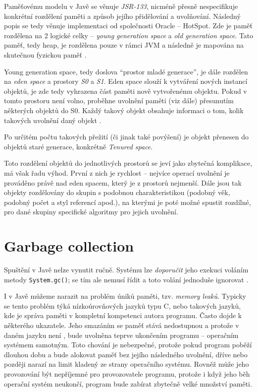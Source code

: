 Paměťovému modelu v Javě se věnuje \textit{JSR-133}, nicméně přesně nespecifikuje konkrétní rozdělení paměti a způsob jejího přidělování a uvolňování. Následný popis se tedy věnuje implementaci od společnosti Oracle – HotSpot. Zde je paměť rozdělena na 2 logické celky – \textit{young generation space} a \textit{old generation space}. Tato paměť, tedy heap, je rozdělena pouze v rámci JVM a následně je mapována na skutečnou fyzickou paměť \cite{jsr133}.

Young generation space, tedy doslova “prostor mladé generace”, je dále rozdělen na \textit{eden space} a prostory \textit{S0} a \textit{S1}. Eden space slouží k vytváření nových instancí objektů, je zde tedy vyhrazena část paměti nově vytvořenému objektu. Pokud v tomto prostoru není volno, proběhne uvolnění paměti (viz dále) přesunutím některých objektů do S0. Každý takový objekt obsahuje informaci o tom, kolik takových uvolnění daný objekt .

Po určitém počtu takových přežití (či jinak také povýšení) je objekt přenesen do objektů staré generace, konkrétně \textit{Tenured space}.

Toto rozdělení objektů do jednotlivých prostorů se jeví jako zbytečná komplikace, má však řadu výhod. První z nich je rychlost – nejvíce operací uvolnění je prováděno právě nad eden spacem, který je z prostorů nejmenší. Dále jsou tak objekty rozdělovány do skupin s podobnou charakteristikou (podobný věk, podobný počet a styl referencí apod.), na kterými je poté možné spustit rozdílné, pro dané skupiny specifické algoritmy pro jejich uvolnění.

\section{Garbage collection}
	Spuštění  v Javě nelze vynutit ručně. Systému lze \textit{doporučit} jeho exekuci voláním metody \texttt{System.gc()};  se tím ale nemusí řídit a toto volání jednoduše ignorovat \cite{javagc}. 

I v Javě můžeme narazit na problém úniků paměti, tzv. \textit{memory leaků}. Typicky se tento problém týká nízkoúrovňových jazyků typu C, nebo takových jazyků, kde je správa paměti v kompletní kompetenci autora programu. Často dojde k  některého ukazatele. Jeho smazáním se paměť stává nedostupnou a protože v daném jazyku není , bude uvolněna teprve ukončením programu -- operačním systémem samotným. Toto chování je nebezpečné, protože pokud program poběží dlouhou dobu a bude alokovat paměť bez jejího následného uvolnění, dříve nebo později narazí na limit kladený ze strany operačního systému. Rovněž může jeho provozování být nepříjemné pro provozovatele programu, protože i když jeho běh operační systém neukončí, program bude zabírat zbytečně velké množství paměti.

